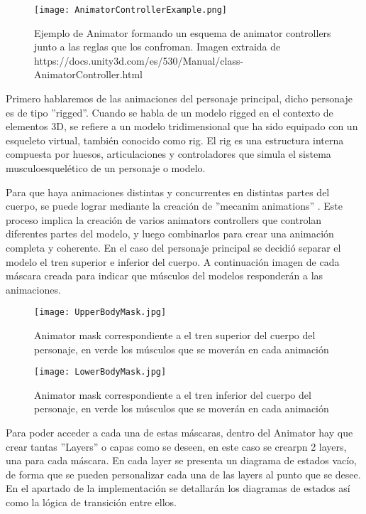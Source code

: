 \begin{figure}[H]
    \centering
    \texttt{[image: AnimatorControllerExample.png]}
    \caption{Ejemplo de Animator formando un esquema de animator controllers junto a las reglas que los confroman. Imagen extraida de https://docs.unity3d.com/es/530/Manual/class-AnimatorController.html }
\end{figure}

Primero hablaremos de las animaciones del personaje principal, dicho personaje es de tipo ''rigged''. Cuando se habla de un modelo rigged en el contexto de elementos 3D, se refiere a un modelo tridimensional que ha sido equipado con un esqueleto virtual, también conocido como rig. El rig es una estructura interna compuesta por huesos, articulaciones y controladores que simula el sistema musculoesquelético de un personaje o modelo.

Para que haya animaciones distintas y concurrentes en distintas partes del cuerpo, se puede lograr mediante la creación de ''mecanim animations'' \cite{MecanimAnimation}. Este proceso implica la creación de varios animators controllers que controlan diferentes partes del modelo, y luego combinarlos para crear una animación completa y coherente. En el caso del personaje principal se decidió separar el modelo el tren superior e inferior del cuerpo. A continuación imagen de cada máscara creada para indicar que músculos del modelos responderán a las animaciones. 

\begin{figure}[H]
    \centering
    \texttt{[image: UpperBodyMask.jpg]}
    \caption{Animator mask correspondiente a el tren superior del cuerpo del personaje, en verde los músculos que se moverán en cada animación}
\end{figure}

\begin{figure}[H]
    \centering
    \texttt{[image: LowerBodyMask.jpg]}
    \caption{Animator mask correspondiente a el tren inferior del cuerpo del personaje, en verde los músculos que se moverán en cada animación}
\end{figure}

Para poder acceder a cada una de estas máscaras, dentro del Animator hay que crear tantas ''Layers'' o capas como se deseen, en este caso se crearpn 2 layers, una para cada máscara. En cada layer se presenta un diagrama de estados vacío, de forma que se pueden personalizar cada una de las layers al punto que se desee. En el apartado de la implementación se detallarán los diagramas de estados así como la lógica de transición entre ellos.

